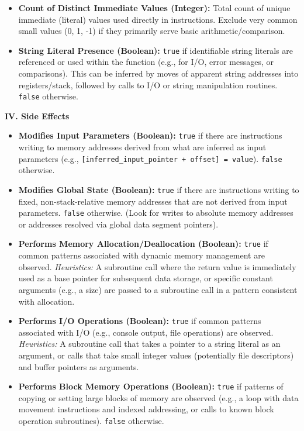 \begin{tcolorbox}
\begin{itemize}[noitemsep, topsep=1pt]
    \item \textbf{Count of Distinct Immediate Values (Integer):} Total count of unique immediate (literal) values used directly in instructions. Exclude very common small values (0, 1, -1) if they primarily serve basic arithmetic/comparison.
    \item \textbf{String Literal Presence (Boolean):} \texttt{true} if identifiable string literals are referenced or used within the function (e.g., for I/O, error messages, or comparisons). This can be inferred by moves of apparent string addresses into registers/stack, followed by calls to I/O or string manipulation routines. \texttt{false} otherwise.
    \end{itemize}
\textbf{IV. Side Effects}
\begin{itemize}[noitemsep, topsep=1pt]
\item \textbf{Modifies Input Parameters (Boolean):} \texttt{true} if there are instructions writing to memory addresses derived from what are inferred as input parameters (e.g., \texttt{[inferred\_input\_pointer + offset] = value}). \texttt{false} otherwise.
\item \textbf{Modifies Global State (Boolean):} \texttt{true} if there are instructions writing to fixed, non-stack-relative memory addresses that are not derived from input parameters. \texttt{false} otherwise. (Look for writes to absolute memory addresses or addresses resolved via global data segment pointers).
\item \textbf{Performs Memory Allocation/Deallocation (Boolean):} \texttt{true} if common patterns associated with dynamic memory management are observed.
   \textit{Heuristics:} A subroutine call where the return value is immediately used as a base pointer for subsequent data storage, or specific constant arguments (e.g., a size) are passed to a subroutine call in a pattern consistent with allocation.
\item \textbf{Performs I/O Operations (Boolean):} \texttt{true} if common patterns associated with I/O (e.g., console output, file operations) are observed.
   \textit{Heuristics:} A subroutine call that takes a pointer to a string literal as an argument, or calls that take small integer values (potentially file descriptors) and buffer pointers as arguments.
\item \textbf{Performs Block Memory Operations (Boolean):} \texttt{true} if patterns of copying or setting large blocks of memory are observed (e.g., a loop with data movement instructions and indexed addressing, or calls to known block operation subroutines). \texttt{false} otherwise.

\end{itemize}
\end{tcolorbox}
